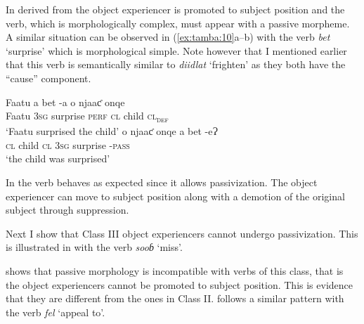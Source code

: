 \documentclass[output=paper]{langscibook}
\begin{document}
In  derived from  the object experiencer is promoted to subject position and the verb, which is morphologically complex, must appear with a passive morpheme. A similar situation can be observed in (\ref{ex:tamba:10}a--b) with the verb \textit{bet} ‘surprise’ which is morphological simple. Note however that I mentioned earlier that this verb is semantically similar to \textit{diidlat} ‘frighten’ as they both have the “cause” component. 

\ea \label{ex:tamba:10}
\ea \label{ex:tamba:10a}
\gll Faatu      a      bet      {}-a        o      njaaƈ onqe\\
Faatu      \textsc{3sg}  surprise \textsc{perf}   \textsc{cl}  child   \textsc{cl\textsubscript{def}}\\
\glt `Faatu surprised the child'
\ex \label{ex:tamba:10b}
\gll  o    njaaƈ  onqe  a      bet       {}-eɁ\\
\textsc{cl}  child   \textsc{cl}     \textsc{3sg}  surprise \textsc{{}-pass}\\
\glt `the child was surprised'
\z
\z

In  the verb behaves as expected since it allows passivization. The object experiencer can move to subject position along with a demotion of the original subject through suppression. 

Next I show that Class III object experiencers cannot undergo passivization. This is illustrated in  with the verb \textit{sooɓ} ‘miss’.

\ea \label{ex:tamba:11}
 \label{ex:tamba:11a}
 \label{ex:tamba:11b}
\z
\z

 shows that passive morphology is incompatible with verbs of this class, that is the object experiencers cannot be promoted to subject position. This is evidence that they are different from the ones in Class II.   follows a similar pattern  with the verb \textit{fel} `appeal to'.
\end{document}
